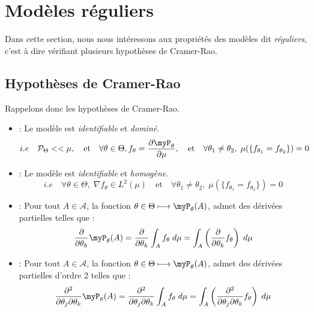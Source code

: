 \minitoc 



\section{Modèles réguliers}

Dans cette section, nous nous intéressons aux propriétés des modèles dit \emph{réguliers}, c'est à dire 
vérifiant plusieurs hypothèses de Cramer-Rao. 

\subsection{Hypothèses de Cramer-Rao}

\begin{proposition}
    Rappelons donc les hypothèses de Cramer-Rao. 
    \begin{itemize}
        \item[$(H_1)$] : Le modèle est \emph{identifiable} et \emph{dominé}. 
        $$ i.e \quad \mathcal{P}_\Theta << \mu, \quad \text{et} \quad \forall \theta \in \Theta, f_\theta = \frac{ \partial \myP_\theta}{ \partial \mu}, 
        \quad \text{et} \quad \forall \theta_1 \not = \theta_2, \; \mu(\{f_{\theta_1} = f_{\theta_2}\}) = 0 
        $$
        \item[$(H_2)$] : Le modèle est \emph{identifiable} et \emph{homogène}. 
        $$ 
            i.e \quad \forall \theta \in \Theta, \; \nabla f_\theta \in L^2( \mu) \quad \text{et} \quad 
            \forall \theta_1 \not = \theta_2, \; \mu(\{f_{\theta_1} = f_{\theta_2}\}) = 0 
        $$ 
        \item[$(H_3)$] : Pour tout $A \in \mathcal{A}$, la fonction $ \theta \in \Theta \longmapsto \myP_\theta(A)$, admet des 
            dérivées partielles telles que : 
            $$ 
                \frac{ \partial}{ \partial \theta_k} \myP_\theta(A) = \frac{ \partial}{ \partial \theta_k} \int_A f_\theta \; d \mu
                = \int_A \left( \frac{ \partial}{ \partial \theta_k} f_\theta \right) \;  d \mu 
            $$ 
        \item[$(H_4)$] : Pour tout $A \in \mathcal{A}$, la fonction $ \theta \in \Theta \longmapsto \myP_\theta(A)$, admet des 
            dérivées partielles d'ordre 2 telles que : 
            $$ 
                \frac{ \partial^2}{ \partial \theta_j \partial \theta_k} \myP_\theta(A) = \frac{ \partial^2}{ \partial \theta_j \partial \theta_k} \int_A f_\theta \; d \mu
                = \int_A \left( \frac{ \partial^2}{ \partial \theta_j \partial \theta_k} f_\theta \right) \;  d \mu 
            $$ 
    \end{itemize}
\end{proposition}

